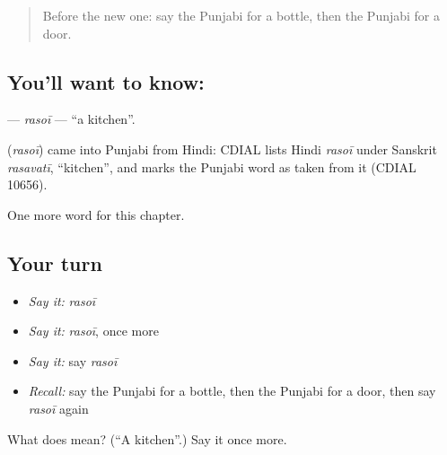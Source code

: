 \begin{quote}
Before the new one: say the Punjabi for a bottle, then the Punjabi for a door.
\end{quote}

\subsection*{You'll want to know: }
\textbf{} — \emph{rasoī} — \textquotedblleft{}a kitchen\textquotedblright{}.

\begin{cousinweb}
\textbf{} (\emph{rasoī}) came into Punjabi from Hindi: CDIAL lists Hindi \emph{rasoī} under Sanskrit \emph{rasavatī}, \textquotedblleft{}kitchen\textquotedblright{}, and marks the Punjabi word as taken from it (CDIAL 10656).
\end{cousinweb}

\begin{grammarlens}[title={What you've built}]
One more word for this chapter.
\end{grammarlens}

\subsection*{Your turn}
\begin{itemize}
\raggedright
  \item \emph{Say it:} \emph{rasoī}
  \item \emph{Say it:} \emph{rasoī}, once more
  \item \emph{Say it:} say \emph{rasoī}
  \item \emph{Recall:} say the Punjabi for a bottle, then the Punjabi for a door, then say \emph{rasoī} again
\end{itemize}

\begin{tcolorbox}[breakable,colback=teal!4,colframe=teal!35!black,title={Before you move on}]
What does  mean? (\textquotedblleft{}A kitchen\textquotedblright{}.) Say it once more.
\end{tcolorbox}
